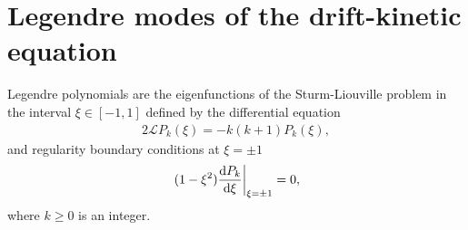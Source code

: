 \documentclass[10pt]{iopart}
\newcommand{\Lorentz}{\mathcal{L}}
\begin{document}
\section{Legendre modes of the drift-kinetic equation}\label{sec:Appendix_Legendre}

Legendre polynomials are the eigenfunctions of the Sturm-Liouville problem in the interval $\xi\in[-1,1]$ defined by the differential equation%
\begin{align}
	2\Lorentz P_k(\xi) = -k(k+1) P_k(\xi), \label{eq:Legendre_eigenvalues}
\end{align}
and regularity boundary conditions at $\xi = \pm 1 $
%
\begin{align}
	\eval{(1-\xi^2)\dv{P_k}{\xi}}_{\xi = \pm 1} = 0,
\end{align}
where $k\ge 0$ is an integer. 
\end{document}
